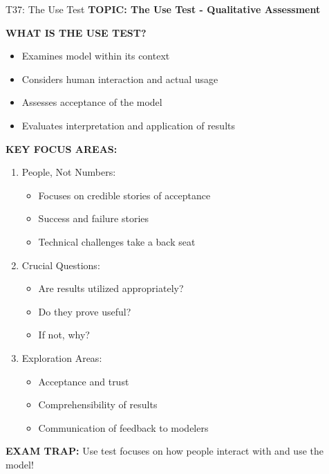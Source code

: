 \documentclass[8pt]{beamer}
\begin{document}
	\begin{frame}{T37: The Use Test}
		\fontsize{6.5}{7.5}\selectfont
		\textbf{TOPIC: The Use Test - Qualitative Assessment}
		
		\vspace{0.1cm}
		\textbf{WHAT IS THE USE TEST?}
		\begin{itemize}
			\item Examines model within its context
			\item Considers human interaction and actual usage
			\item Assesses acceptance of the model
			\item Evaluates interpretation and application of results
		\end{itemize}
		
		\vspace{0.1cm}
		\textbf{KEY FOCUS AREAS:}
		\begin{enumerate}
			\item \textcolor{myblue}{People, Not Numbers:}
			\begin{itemize}
				\item Focuses on credible stories of acceptance
				\item Success and failure stories
				\item Technical challenges take a back seat
			\end{itemize}
			\item \textcolor{myblue}{Crucial Questions:}
			\begin{itemize}
				\item Are results utilized appropriately?
				\item Do they prove useful?
				\item If not, why?
			\end{itemize}
			\item \textcolor{myblue}{Exploration Areas:}
			\begin{itemize}
				\item Acceptance and trust
				\item Comprehensibility of results
				\item Communication of feedback to modelers
			\end{itemize}
		\end{enumerate}
		
		\textcolor{myred}{\textbf{EXAM TRAP:}} Use test focuses on \textcolor{myblue}{how people interact with and use the model}!
	\end{frame}
	
\end{document}
